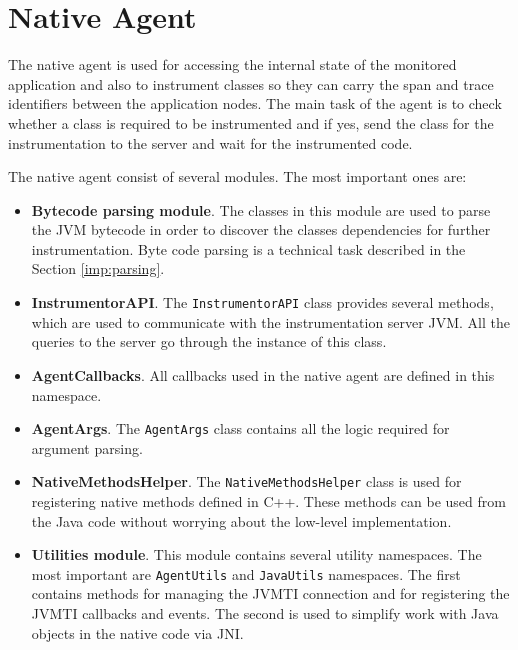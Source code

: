 \section{Native Agent}
\label{native_agent_design}
The native agent is used for accessing the internal state of the monitored application and also to instrument classes so they can carry the span and trace identifiers between the application nodes. The main task of the agent is to check whether a class is required to be instrumented and if yes, send the class for the instrumentation to the server and wait for the instrumented code.

The native agent consist of several modules. The most important ones are:
\begin{itemize}
	\item \textbf{Bytecode parsing module}. \newline The classes in this module are used to parse the JVM bytecode in order to discover the classes dependencies for further instrumentation. Byte code parsing is a technical task described in the Section \ref{imp:parsing}.
	\item \textbf{InstrumentorAPI}. \newline The \texttt{InstrumentorAPI} class provides several methods, which are used to communicate with the instrumentation server JVM. All the queries to the server go through the instance of this class.
	\item \textbf{AgentCallbacks}. \newline All callbacks used in the native agent are defined in this namespace.
	\item \textbf{AgentArgs}.  \newline The \texttt{AgentArgs} class contains all the logic required for argument parsing.
	\item \textbf{NativeMethodsHelper}. \newline The \texttt{NativeMethodsHelper} class is used for registering native methods defined in C++. These methods can be used from the Java code without worrying about the low-level implementation.
	\item \textbf{Utilities module}. \newline This module contains several utility namespaces. The most important are \texttt{AgentUtils} and \texttt{JavaUtils} namespaces. The first contains methods for managing the JVMTI connection and for registering the JVMTI callbacks and events. The second is used to simplify work with Java objects in the native code via JNI.
\end{itemize}

